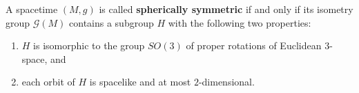 A spacetime $(M, g)$ is called \textbf{spherically symmetric} if and only if its isometry group $\mathcal{G}(M)$ contains a subgroup $H$ with the following two properties:
\begin{enumerate}
  \item $H$ is isomorphic to the group $SO(3)$ of proper rotations of Euclidean $3$-space, and
  \item each orbit of $H$ is spacelike and at most $2$-dimensional.
\end{enumerate}
